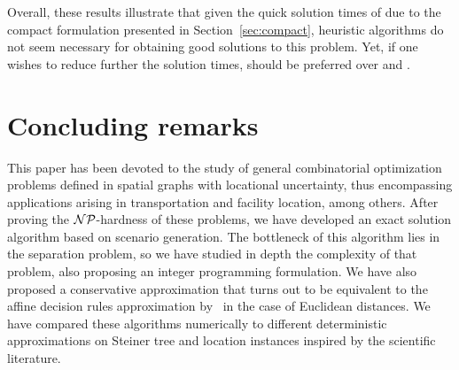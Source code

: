 \documentclass[12pt]{article}
\begin{document}

Overall, these results illustrate that given the quick solution times of \exact{} due to the compact formulation presented in Section~\ref{sec:compact}, heuristic algorithms do not seem necessary for obtaining good solutions to this problem. Yet, if one wishes to reduce further the solution times, \avg{} should be preferred over \worst{} and \hcenter{}.




\section{Concluding remarks}

This paper has been devoted to the study of general combinatorial optimization problems defined in spatial graphs with locational uncertainty, thus encompassing applications arising in transportation and facility location, among others. 
After proving the $\mathcal{NP}$-hardness of these problems, we have developed an exact solution algorithm based on scenario generation. The bottleneck of this algorithm lies in the separation problem, so we have studied in depth the complexity of that problem, also proposing an integer programming formulation. We have also proposed a conservative approximation that turns out to be equivalent to the affine decision rules approximation by~\cite{zhen2021robust} in the case of Euclidean distances. We have compared these algorithms numerically to different deterministic approximations on Steiner tree and location instances inspired by the scientific literature.
\end{document}
